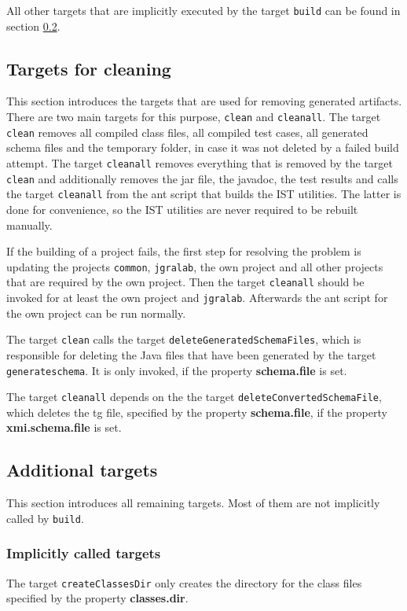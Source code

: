 \documentclass[a4paper,twoside,11pt,bibtotoc]{article}
\begin{document}
All other targets that are implicitly executed by the target \texttt{build} can be found in section \ref{sec:additional}.

\subsection{Targets for cleaning}
\label{sec:cleaning}
This section introduces the targets that are used for removing generated artifacts.
There are two main targets for this purpose, \texttt{clean} and \texttt{cleanall}.
The target \texttt{clean} removes all compiled class files, all compiled test cases, all generated schema files and the temporary folder, in case it was not deleted by a failed build attempt.
The target \texttt{cleanall} removes everything that is removed by the target \texttt{clean} and additionally removes the jar file, the javadoc, the test results and calls the target \texttt{cleanall} from the ant script that builds the IST utilities.
The latter is done for convenience, so the IST utilities are never required to be rebuilt manually.

If the building of a project fails, the first step for resolving the problem is updating the projects \texttt{common}, \texttt{jgralab}, the own project and all other projects that are required by the own project.
Then the target \texttt{cleanall} should be invoked for at least the own project and \texttt{jgralab}.
Afterwards the ant script for the own project can be run normally.

The target \texttt{clean} calls the target \texttt{deleteGeneratedSchemaFiles}, which is responsible for deleting the Java files that have been generated by the target \texttt{generateschema}.
It is only invoked, if the property \textbf{schema.file} is set.

The target \texttt{cleanall} depends on the the target \texttt{deleteConvertedSchemaFile}, which deletes the tg file, specified by the property \textbf{schema.file}, if the property \textbf{xmi.schema.file} is set.


\subsection{Additional targets}
\label{sec:additional}
This section introduces all remaining targets.
Most of them are not implicitly called by \texttt{build}.

\subsubsection{Implicitly called targets}
The target \texttt{createClassesDir} only creates the directory for the class files specified by the property \textbf{classes.dir}.
\end{document}
